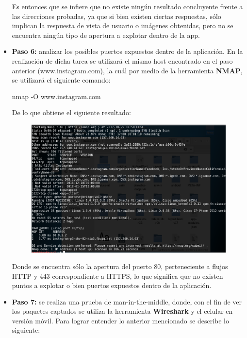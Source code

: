 \documentclass[a4paper,11pt]{article}
\theoremstyle{mytheor}
\begin{document}
\begin{itemize}
    Es entonces que se infiere que no existe ningún resultado concluyente frente a las direcciones probadas, ya que si bien existen ciertas respuestas, sólo implican la respuesta de vista de usuario o imágenes obtenidas, pero no se encuentra ningún tipo de apertura a explotar dentro de la app.
    
    
    \item \textbf{Paso 6:} analizar los posibles puertos expuestos dentro de la aplicación. En la realización de dicha tarea se utilizará el mismo host encontrado en el paso anterior (www.instagram.com), la cuál por medio de la herramienta \textbf{NMAP}, se utilizará el siguiente comando:
    
    \begin{center}
        nmap -O www.instagram.com
    \end{center}
    
    De lo que obtiene el siguiente resultado:
    
       
     \begin{figure}[!h]
    \centering
    \includegraphics[scale=0.3]{nmap.png}
    \label{fig:my_label}
    \end{figure}
    
    Donde se encuentra sólo la apertura del puerto 80, perteneciente a flujos HTTP y 443 correspondiente a HTTPS, lo que significa que no existen puntos a explotar o bien puertos expuestos dentro de la aplicación. 
    
    \item \textbf{Paso 7:} se realiza una prueba de man-in-the-middle, donde, con el fin de ver los paquetes captados se utiliza la herramienta \textbf{Wireshark} y el celular en versión móvil.
    Para lograr entender lo anterior mencionado se describe lo siguiente:
    

\end{itemize}
\end{document}
